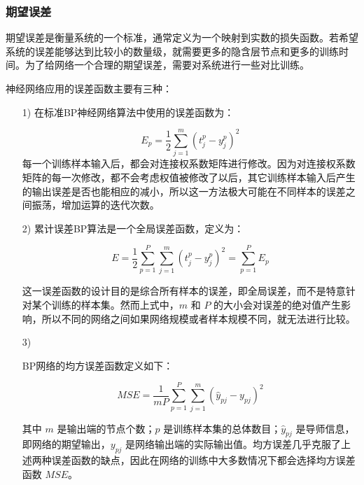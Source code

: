 \documentclass[UTF8]{ctexart}
\begin{document}
\subsubsection{期望误差}

期望误差是衡量系统的一个标准，通常定义为一个映射到实数的损失函数。若希望系统的误差能够达到比较小的数量级，就需要更多的隐含层节点和更多的训练时间。为了给网络一个合理的期望误差，需要对系统进行一些对比训练。 \par

神经网络应用的误差函数主要有三种： \par

\begin{itemize}
\item [1)]
在标准BP神经网络算法中使用的误差函数为： \par
\begin{equation}
E_p = \frac{1}{2} \sum_{j=1}^{m} (t_j^p - y_j^p)^2
\end{equation}
每一个训练样本输入后，都会对连接权系数矩阵进行修改。因为对连接权系数矩阵的每一次修改，都不会考虑权值被修改了以后，其它训练样本输入后产生的输出误差是否也能相应的减小，所以这一方法极大可能在不同样本的误差之间振荡，增加运算的迭代次数。

\item [2)]
累计误差BP算法是一个全局误差函数，定义为： \par
\begin{equation}
E = \frac{1}{2} \sum_{p=1}^{P} \sum_{j=1}^{m} (t_j^p - y_j^p)^2 = \sum_{p=1}^{P} E_p
\end{equation}

这一误差函数的设计目的是综合所有样本的误差，即全局误差，而不是特意针对某个训练的样本集。然而上式中，$m$ 和 $P$ 的大小会对误差的绝对值产生影响，所以不同的网络之间如果网络规模或者样本规模不同，就无法进行比较。

\item [3)]

BP网络的均方误差函数定义如下： \par

\begin{equation}
MSE = \frac{1}{mP} \sum_{p=1}^{P} \sum_{j=1}^{m} (\hat{y}_{pj} - y_{pj})^2
\end{equation}

其中 $m$ 是输出端的节点个数；$p$ 是训练样本集的总体数目；$\hat{y}_{pj}$ 是导师信息，即网络的期望输出，$y_{pj}$ 是网络输出端的实际输出值。均方误差几乎克服了上述两种误差函数的缺点，因此在网络的训练中大多数情况下都会选择均方误差函数 $MSE$。

\end{itemize}
\end{document}
